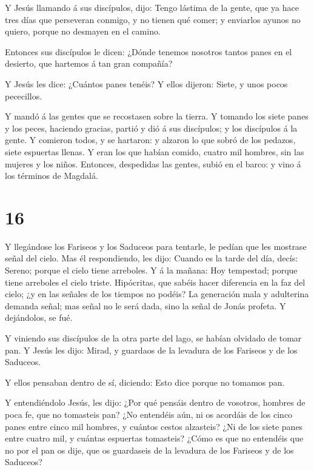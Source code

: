  Y Jesús llamando á sus discípulos, dijo: Tengo lástima de
la gente, que ya hace tres días que perseveran conmigo, y no tienen qué
comer; y enviarlos ayunos no quiero, porque no desmayen en el camino.

 Entonces sus discípulos le dicen: ¿Dónde tenemos nosotros
tantos panes en el desierto, que hartemos á tan gran compañía?

 Y Jesús les dice: ¿Cuántos panes tenéis? Y ellos dijeron:
Siete, y unos pocos pececillos.

 Y mandó á las gentes que se recostasen sobre la tierra.
 Y tomando los siete panes y los peces, haciendo gracias,
partió y dió á sus discípulos; y los discípulos á la gente.
 Y comieron todos, y se hartaron: y alzaron lo que sobró de
los pedazos, siete espuertas llenas.  Y eran los que habían
comido, cuatro mil hombres, sin las mujeres y los niños. 
Entonces, despedidas las gentes, subió en el barco: y vino á los
términos de Magdalá.

\hypertarget{section-15}{%
\section{16}\label{section-15}}

 Y llegándose los Fariseos y los Saduceos para tentarle, le
pedían que les mostrase señal del cielo.  Mas él
respondiendo, les dijo: Cuando es la tarde del día, decís: Sereno;
porque el cielo tiene arreboles.  Y á la mañana: Hoy
tempestad; porque tiene arreboles el cielo triste. Hipócritas, que
sabéis hacer diferencia en la faz del cielo; ¿y en las señales de los
tiempos no podéis?  La generación mala y adulterina demanda
señal; mas señal no le será dada, sino la señal de Jonás profeta. Y
dejándolos, se fué.

 Y viniendo sus discípulos de la otra parte del lago, se
habían olvidado de tomar pan.  Y Jesús les dijo: Mirad, y
guardaos de la levadura de los Fariseos y de los Saduceos.

 Y ellos pensaban dentro de sí, diciendo: Esto dice porque
no tomamos pan.

 Y entendiéndolo Jesús, les dijo: ¿Por qué pensáis dentro de
vosotros, hombres de poca fe, que no tomasteis pan?  ¿No
entendéis aún, ni os acordáis de los cinco panes entre cinco mil
hombres, y cuántos cestos alzasteis?  ¿Ni de los siete
panes entre cuatro mil, y cuántas espuertas tomasteis? 
¿Cómo es que no entendéis que no por el pan os dije, que os guardaseis
de la levadura de los Fariseos y de los Saduceos?

